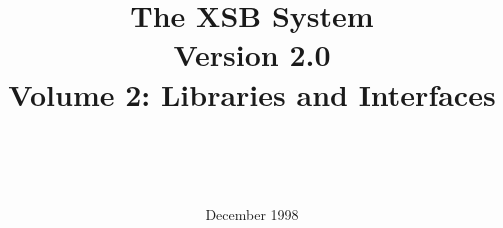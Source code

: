 \documentclass[11pt]{report}
\newcommand{\version}{Version 2.0}
\begin{document}
\title{\bf The XSB System \\ \version \\ Volume 2: Libraries and Interfaces}

\author{{\epsfxsize=230pt }\\
	\ \\ \ \\
} 

\date{December 1998}

\maketitle



\thispagestyle{empty}

\newpage
\thispagestyle{empty}
%

\tableofcontents
\newpage	%
  











\end{document}
